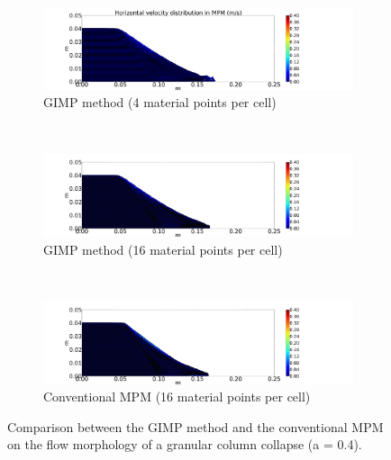 \begin{figure}
\ContinuedFloat
	\centering
	\begin{subfigure}[b]{\textwidth}
		\centering
		\includegraphics[width=\textwidth]{4GIMPM_6tc}
		\caption{GIMP method (4 material points per cell)}
		\label{fig:4GIMPM_6tc}
	\end{subfigure} \\
	\begin{subfigure}[b]{\textwidth}
		\centering
		\includegraphics[width=\textwidth]{16GIMPM_6tc}
		\caption{GIMP method (16 material points per cell)}
		\label{fig:16GIMPM_6tc}
	\end{subfigure} \\
	\begin{subfigure}[b]{\textwidth}
		\centering
		\includegraphics[width=\textwidth]{16MPM_6tc}
		\caption{Conventional MPM (16 material points per cell)}
		\label{fig:16MPM_6tc}
	\end{subfigure}
	\caption*{$t = 6\tau_c$}
	\caption{Comparison between the GIMP method and the conventional MPM on the 
	flow morphology of a granular column collapse (a = 0.4).}
	\label{fig:MPM_GIMP_TC}
\end{figure} 

